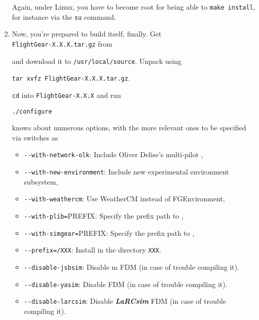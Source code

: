 \begin{enumerate}
 \noindent
 Again, under Linux, you have to become root for being able to \texttt{make
install}, for instance via the \texttt{su} command.

\item Now, you're prepared to build \FlightGear{} itself, finally.
 Get\\ \texttt{FlightGear-X.X.X.tar.gz} from
  \medskip

   \medskip

 \noindent
and download it to \texttt{/usr/local/source}. Unpack \FlightGear{} using
 \medskip

        \texttt{tar xvfz FlightGear-X.X.X.tar.gz}.
 \medskip

\texttt{cd} into \texttt{FlightGear-X.X.X} and run

        \texttt{./configure}
 \medskip

 knows about numerous options,  with the more
relevant ones to be specified via switches as

\begin{itemize}
\item{\texttt{-$ $-with-network-olk}}:      Include Oliver Delise's multi-pilot ,

\item{\texttt{-$ $-with-new-environment}}:    Include new experimental environment subsystem,

\item{\texttt{-$ $-with-weathercm}}:    Use WeatherCM instead of FGEnvironment,

\item{\texttt{-$ $-with-plib=}PREFIX}:  Specify the prefix path to \PLIB{},

\item{\texttt{-$ $-with-simgear=}PREFIX}:  Specify the prefix path to \SimGear{},

\item{\texttt{-$ $-prefix=/XXX}}: Install \FlightGear{} in the directory \texttt{XXX}.

\item{\texttt{-$ $-disable-jsbsim}}: Disable \JSBSim{}m FDM (in case of trouble compiling it).

\item{\texttt{-$ $-disable-yasim}}: Disable \YASim{} FDM (in case of trouble compiling it).

\item{\texttt{-$ $-disable-larcsim}}: Disable \textbf{\textit{LaRCsim}} FDM (in case of trouble compiling it).


\end{itemize}
\end{enumerate}
